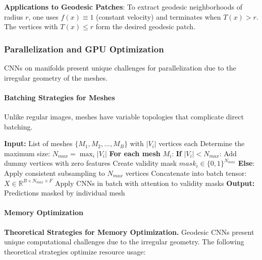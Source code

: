 \textbf{Applications to Geodesic Patches}:
To extract geodesic neighborhoods of radius $r$, one uses $f(x) \equiv 1$ (constant velocity) and terminates when $T(x) > r$. The vertices with $T(x) \leq r$ form the desired geodesic patch.

\subsubsection{Parallelization and GPU Optimization}\label{subsubsec:optimizacion_gpu}

CNNs on manifolds present unique challenges for parallelization due to the irregular geometry of the meshes.

\paragraph{Batching Strategies for Meshes}

Unlike regular images, meshes have variable topologies that complicate direct batching.

\begin{algorithm}[H]
\caption{Adaptive Batching for Meshes of Variable Sizes}
\begin{algorithmic}[1]
    \State \textbf{Input:} List of meshes $\{M_1, M_2, ..., M_B\}$ with $|V_i|$ vertices each
    \State Determine the maximum size: $N_{max} = \max_i |V_i|$
    \State \textbf{For each mesh} $M_i$:
    \State \quad \textbf{If} $|V_i| < N_{max}$:
    \State \quad \quad Add dummy vertices with zero features
    \State \quad \quad Create validity mask $mask_i \in \{0,1\}^{N_{max}}$
    \State \quad \textbf{Else}:
    \State \quad \quad Apply consistent subsampling to $N_{max}$ vertices
    \State Concatenate into batch tensor: $X \in \mathbb{R}^{B \times N_{max} \times F}$
    \State Apply CNNs in batch with attention to validity masks
    \State \textbf{Output:} Predictions masked by individual mesh
\end{algorithmic}
\end{algorithm}

\paragraph{Memory Optimization}

\textbf{Theoretical Strategies for Memory Optimization.} Geodesic CNNs present unique computational challenges due to the irregular geometry. The following theoretical strategies optimize resource usage:


